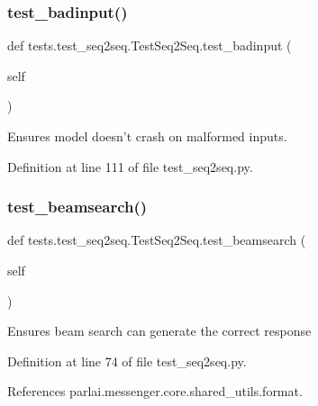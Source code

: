 \subsubsection{\texorpdfstring{test\+\_\+badinput()}{test\_badinput()}}
{\footnotesize\ttfamily def tests.\+test\+\_\+seq2seq.\+Test\+Seq2\+Seq.\+test\+\_\+badinput (\begin{DoxyParamCaption}\item[{}]{self }\end{DoxyParamCaption})}

\begin{DoxyVerb}Ensures model doesn't crash on malformed inputs.\end{DoxyVerb}
 

Definition at line 111 of file test\+\_\+seq2seq.\+py.

\mbox{\label{classtests_1_1test__seq2seq_1_1TestSeq2Seq_a78cb1bf4c31e8cd73d53e48797b9d7d9}} 
\subsubsection{\texorpdfstring{test\+\_\+beamsearch()}{test\_beamsearch()}}
{\footnotesize\ttfamily def tests.\+test\+\_\+seq2seq.\+Test\+Seq2\+Seq.\+test\+\_\+beamsearch (\begin{DoxyParamCaption}\item[{}]{self }\end{DoxyParamCaption})}

\begin{DoxyVerb}Ensures beam search can generate the correct response\end{DoxyVerb}
 

Definition at line 74 of file test\+\_\+seq2seq.\+py.



References parlai.\+messenger.\+core.\+shared\+\_\+utils.\+format.

\mbox{\label{classtests_1_1test__seq2seq_1_1TestSeq2Seq_a203ba54e9671ce31936a202a4e2e6686}} 
